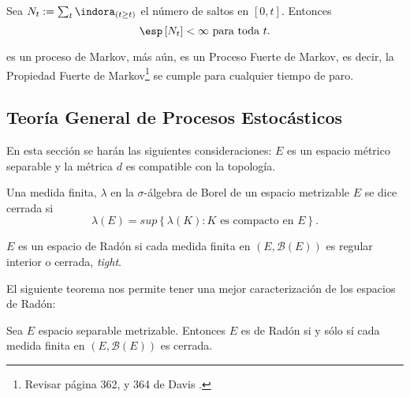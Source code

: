 \begin{Sup}\label{Sup3.1.Davis}
Sea $N_{t}:=\sum_{t}\indora_{\left(t\geq t\right)}$ el n\'umero de
saltos en $\left[0,t\right]$. Entonces
\begin{equation}
\esp\left[N_{t}\right]<\infty\textrm{ para toda }t.
\end{equation}
\end{Sup}

es un proceso de Markov, m\'as a\'un, es un Proceso Fuerte de
Markov, es decir, la Propiedad Fuerte de Markov\footnote{Revisar
p\'agina 362, y 364 de Davis \cite{Davis}.} se cumple para
cualquier tiempo de paro.
\subsection{Teor\'ia General de Procesos Estoc\'asticos}
En esta secci\'on se har\'an las siguientes consideraciones: $E$
es un espacio m\'etrico separable y la m\'etrica $d$ es compatible
con la topolog\'ia.

\begin{Def}
Una medida finita, $\lambda$ en la $\sigma$-\'algebra de Borel de
un espacio metrizable $E$ se dice cerrada si
\begin{equation}\label{Eq.A2.3}
\lambda\left(E\right)=sup\left\{\lambda\left(K\right):K\textrm{ es
compacto en }E\right\}.
\end{equation}
\end{Def}

\begin{Def}
$E$ es un espacio de Rad\'on si cada medida finita en
$\left(E,\mathcal{B}\left(E\right)\right)$ es regular interior o cerrada,
{\em tight}.
\end{Def}


El siguiente teorema nos permite tener una mejor caracterizaci\'on de los espacios de Rad\'on:
\begin{Teo}\label{Tma.A2.2}
Sea $E$ espacio separable metrizable. Entonces $E$ es de Rad\'on
si y s\'olo s\'i cada medida finita en
$\left(E,\mathcal{B}\left(E\right)\right)$ es cerrada.
\end{Teo}

